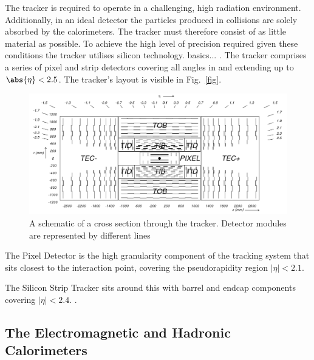 The tracker is required to operate in a challenging, high radiation
environment. Additionally, in an ideal detector the particles produced
in collisions are solely absorbed by the calorimeters. The tracker
must therefore consist of as little material as possible. To achieve
the high level of precision required given these conditions the
tracker utilises silicon technology. basics... . The tracker comprises a
series of pixel and strip detectors covering all angles in \phi and
extending up to $\abs{\eta}<2.5$. The tracker's layout is visible in
Fig.~\ref{fig}. 

\begin{figure}
\begin{center}
\includegraphics[width=0.8\linewidth]{figs/cmstracker} \end{center}
\caption{ A schematic of a cross section through the \CMS tracker.
Detector modules are represented by different lines \cite{Chatrchyan:2008aa}}
\label{fig:tracker} \end{figure}


The Pixel Detector is the high granularity component of the tracking
system that sits closest to the interaction point, covering the
pseudorapidity region $|\eta|<2.1$. 

The Silicon Strip
Tracker sits around this with barrel and endcap components covering
$|\eta|<2.4$. \cite{Adam_Elwood_MSci}. 


\subsection{The Electromagnetic and Hadronic Calorimeters} 

